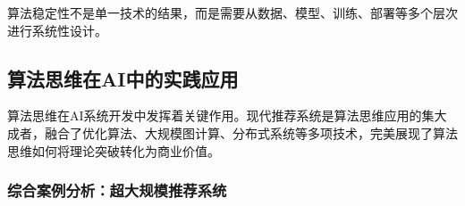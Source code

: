 算法稳定性不是单一技术的结果，而是需要从数据、模型、训练、部署等多个层次进行系统性设计。
%
%
%
%
%
%
%

\subsection{算法思维在AI中的实践应用}

算法思维在AI系统开发中发挥着关键作用。现代推荐系统是算法思维应用的集大成者，融合了优化算法、大规模图计算、分布式系统等多项技术，完美展现了算法思维如何将理论突破转化为商业价值。

\subsubsection{综合案例分析：超大规模推荐系统}

